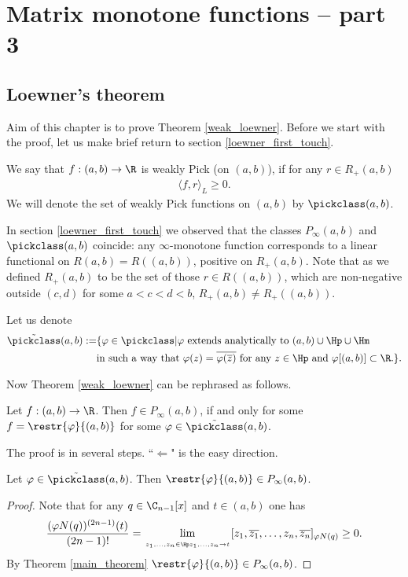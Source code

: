 \chapter{Matrix monotone functions -- part 3}

\section{Loewner's theorem}

Aim of this chapter is to prove Theorem \ref{weak_loewner}. Before we start with the proof, let us make brief return to section \ref{loewner_first_touch}.

\begin{maar}
	We say that $f : (a, b) \to \R$ is weakly Pick (on $(a, b)$), if for any $r \in R_{+}(a, b)$
	\begin{align*}
		\langle f, r\rangle_{L} \geq 0.
	\end{align*}
	We will denote the set of weakly Pick functions on $(a, b)$ by $\pickclass(a, b)$.
\end{maar}

In section \ref{loewner_first_touch} we observed that the classes $P_{\infty}(a, b)$ and  $\pickclass(a, b)$ coincide: any $\infty$-monotone function corresponds to a linear functional on $R(a, b) = R((a, b))$, positive on $R_{+}(a, b)$. Note that as we defined $R_{+}(a, b)$ to be the set of those $r \in R((a, b))$, which are non-negative outside $(c, d)$ for some $a < c < d < b$, $R_{+}(a, b) \neq R_{+}((a, b))$.

Let us denote
\begin{align*}
	\tilde{\pickclass}(a, b) :=& \{\varphi \in \pickclass | \text{$\varphi$ extends analytically to $(a, b) \cup \Hp \cup \Hm$} \\
	&\text{in such a way that $\varphi(z) = \overline{\varphi(\overline{z})}$ for any $z \in \Hp$ and $\varphi[(a, b)] \subset \R.$}\}.
\end{align*}

Now Theorem \ref{weak_loewner} can be rephrased as follows.
\begin{lause}\label{better_weak_loewner}
	Let $f : (a, b) \to \R$. Then $f \in P_{\infty}(a, b)$, if and only for some $f = \restr{\varphi}{(a, b)}$ for some $\varphi \in \tilde{\pickclass}(a, b)$.
\end{lause}

The proof is in several steps. ``$\Leftarrow$" is the easy direction.
\begin{lem}\label{loewner_easy}
	Let $\varphi \in \tilde{\pickclass}(a, b)$. Then $\restr{\varphi}{(a, b)} \in P_{\infty}(a, b)$.
\end{lem}
\begin{proof}
	Note that for any $q \in \C_{n - 1}[x]$ and $t \in (a, b)$ one has
	\begin{align*}
		\frac{(\varphi N(q))^{(2 n - 1)}(t)}{(2 n - 1)!} = \lim_{\atop{z_{1}, \ldots, z_{n} \in \Hp}{z_{1}, \ldots, z_{n} \to t}} [z_{1}, \overline{z_{1}}, \ldots, z_{n}, \overline{z_{n}}]_{\varphi N(q)} \geq 0.
	\end{align*}
	By Theorem \ref{main_theorem} $\restr{\varphi}{(a, b)} \in P_{\infty}(a, b)$.
\end{proof}

